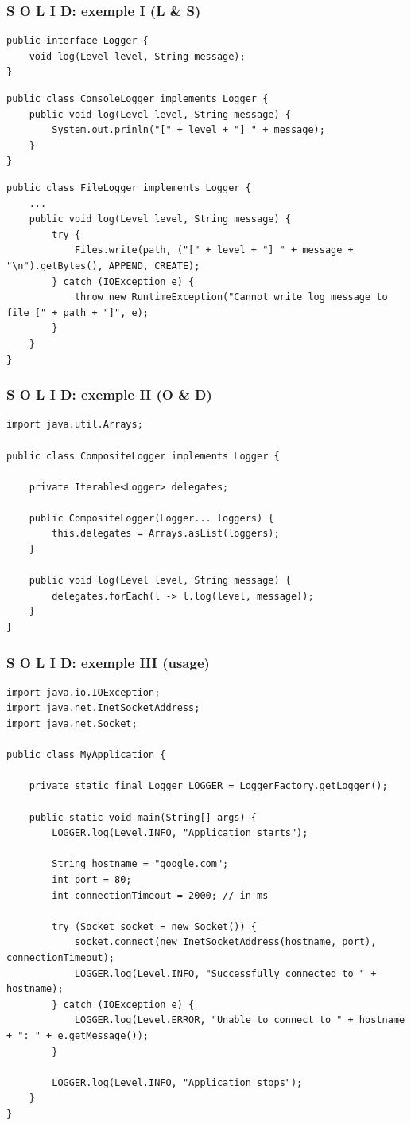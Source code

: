 \begin{frame}[fragile]
	\frametitle{S O L I D: exemple I (L \& S)}
	\begin{lstlisting}
public interface Logger {
	void log(Level level, String message);
}
	\end{lstlisting}
    \begin{lstlisting}
public class ConsoleLogger implements Logger {
	public void log(Level level, String message) {
		System.out.prinln("[" + level + "] " + message);
	}
}
	\end{lstlisting}
    \begin{lstlisting}[basicstyle=\tiny]
public class FileLogger implements Logger {
	...
    public void log(Level level, String message) {
        try {
            Files.write(path, ("[" + level + "] " + message + "\n").getBytes(), APPEND, CREATE);
        } catch (IOException e) {
            throw new RuntimeException("Cannot write log message to file [" + path + "]", e);
        }
    }
}
	\end{lstlisting}
\end{frame}

\begin{frame}[fragile]
	\frametitle{S O L I D: exemple II (O \& D)}
	\begin{lstlisting}
import java.util.Arrays;

public class CompositeLogger implements Logger {

	private Iterable<Logger> delegates;

	public CompositeLogger(Logger... loggers) {
		this.delegates = Arrays.asList(loggers);
	}

	public void log(Level level, String message) {
		delegates.forEach(l -> l.log(level, message));
	}
}
	\end{lstlisting}
\end{frame}

\begin{frame}[fragile]
	\frametitle{S O L I D: exemple III (usage)}
	\begin{lstlisting}[basicstyle=\tiny]
import java.io.IOException;
import java.net.InetSocketAddress;
import java.net.Socket;

public class MyApplication {

	private static final Logger LOGGER = LoggerFactory.getLogger();

	public static void main(String[] args) {
		LOGGER.log(Level.INFO, "Application starts");

		String hostname = "google.com";
		int port = 80;
		int connectionTimeout = 2000; // in ms

		try (Socket socket = new Socket()) {
			socket.connect(new InetSocketAddress(hostname, port), connectionTimeout);
			LOGGER.log(Level.INFO, "Successfully connected to " + hostname);
		} catch (IOException e) {
			LOGGER.log(Level.ERROR, "Unable to connect to " + hostname + ": " + e.getMessage());
		}

		LOGGER.log(Level.INFO, "Application stops");
	}
}
	\end{lstlisting}
\end{frame}

